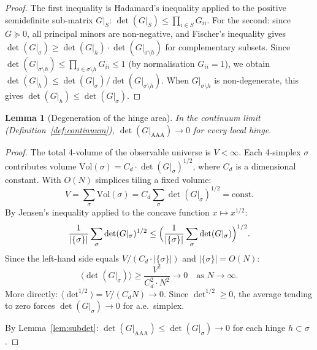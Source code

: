 \documentclass[12pt]{article}
\newtheorem{lemma}[theorem]{Lemma}
\theoremstyle{remark}
\theoremstyle{definition}
\begin{document}
\begin{proof}
The first inequality is Hadamard's inequality applied to the positive
semidefinite sub-matrix $G|_S$: $\det(G|_S) \leq \prod_{i \in S} G_{ii}$.
For the second: since $G \succeq 0$, all principal minors are
non-negative, and Fischer's inequality gives
$\det(G|_\sigma) \geq \det(G|_h) \cdot \det(G|_{\sigma \setminus h})$
for complementary subsets.  Since
$\det(G|_{\sigma \setminus h}) \leq \prod_{i \in \sigma \setminus h}
G_{ii} \leq 1$ (by normalisation $G_{ii} = 1$), we obtain
$\det(G|_h) \leq \det(G|_\sigma) / \det(G|_{\sigma \setminus h})$.
When $G|_{\sigma \setminus h}$ is non-degenerate, this gives
$\det(G|_h) \leq \det(G|_\sigma)$.
\end{proof}

\begin{lemma}[Degeneration of the hinge area]
\label{lem:degen}
In the continuum limit (Definition~\ref{def:continuum}),
$\det(G|_{\mathrm{AAA}}) \to 0$ for every local hinge.
\end{lemma}

\begin{proof}
The total 4-volume of the observable universe is $V < \infty$.  Each
4-simplex $\sigma$ contributes volume
$\mathrm{Vol}(\sigma) = C_d \cdot \det(G|_\sigma)^{1/2}$, where $C_d$
is a dimensional constant.  With $O(N)$ simplices tiling a fixed volume:
\begin{equation}
V = \sum_\sigma \mathrm{Vol}(\sigma)
  = C_d \sum_\sigma \det(G|_\sigma)^{1/2}
  = \mathrm{const}.
\end{equation}
By Jensen's inequality applied to the concave function $x \mapsto x^{1/2}$:
\begin{equation}
\frac{1}{|\{\sigma\}|} \sum_\sigma \det(G|_\sigma)^{1/2}
\leq \Bigl(\frac{1}{|\{\sigma\}|} \sum_\sigma \det(G|_\sigma)\Bigr)^{1/2}.
\end{equation}
Since the left-hand side equals $V / (C_d \cdot |\{\sigma\}|)$
and $|\{\sigma\}| = O(N)$:
\begin{equation}
\langle \det(G|_\sigma) \rangle \geq \frac{V^2}{C_d^2 \cdot N^2}
\to 0 \quad \text{as } N \to \infty.
\end{equation}
More directly: $\langle \det^{1/2} \rangle = V / (C_d N) \to 0$.
Since $\det^{1/2} \geq 0$, the average tending to zero forces
$\det(G|_\sigma) \to 0$ for a.e.\ simplex.

By Lemma~\ref{lem:subdet}: $\det(G|_{\mathrm{AAA}}) \leq
\det(G|_\sigma) \to 0$ for each hinge $h \subset \sigma$.
\end{proof}
\end{document}

